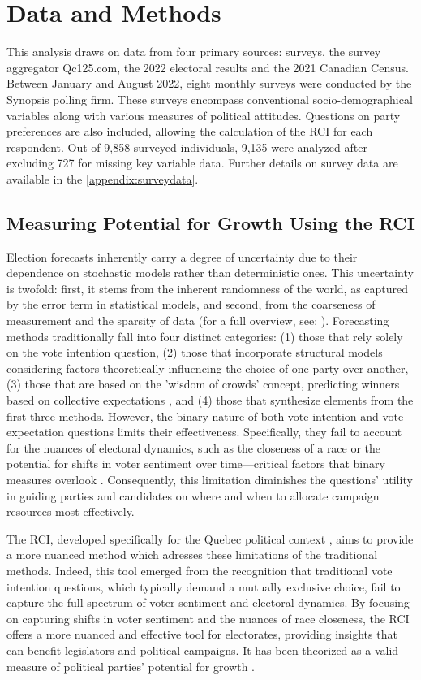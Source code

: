 \documentclass[
  journal=medium,
  manuscript=article-type,
  year=2024
]{cup-journal}
\begin{document}
\section{Data and Methods}
This analysis draws on data from four primary sources: surveys, the survey aggregator Qc125.com, the 2022 electoral results and the 2021 Canadian Census. Between January and August 2022, eight monthly surveys were conducted by the Synopsis polling firm. These surveys encompass conventional socio-demographical variables along with various measures of political attitudes. Questions on party preferences are also included, allowing the calculation of the RCI for each respondent. Out of 9,858 surveyed individuals, 9,135 were analyzed after excluding 727 for missing key variable data. Further details on survey data are available in the \ref{appendix:surveydata}.

\subsection{Measuring Potential for Growth Using the RCI}

Election forecasts inherently carry a degree of uncertainty due to their dependence on stochastic models rather than deterministic ones. This uncertainty is twofold: first, it stems from the inherent randomness of the world, as captured by the error term in statistical models, and second, from the coarseness of measurement and the sparsity of data (for a full overview, see: \textcite{lewis-beck05}). Forecasting methods traditionally fall into four distinct categories: (1) those that rely solely on the vote intention question, (2) those that incorporate structural models considering factors theoretically influencing the choice of one party over another, (3) those that are based on the 'wisdom of crowds' concept, predicting winners based on collective expectations \parencite{bassamboo_etal15}, and (4) those that synthesize elements from the first three methods. However, the binary nature of both vote intention and vote expectation questions limits their effectiveness. Specifically, they fail to account for the nuances of electoral dynamics, such as the closeness of a race or the potential for shifts in voter sentiment over time—critical factors that binary measures overlook \autocite{dufresne_etal22, murr_etal21}. Consequently, this limitation diminishes the questions' utility in guiding parties and candidates on where and when to allocate campaign resources most effectively.

The RCI, developed specifically for the Quebec political context \autocite{dufresne_etal22a}, aims to provide a more nuanced method which adresses these limitations of the traditional methods. Indeed, this tool emerged from the recognition that traditional vote intention questions, which typically demand a mutually exclusive choice, fail to capture the full spectrum of voter sentiment and electoral dynamics. By focusing on capturing shifts in voter sentiment and the nuances of race closeness, the RCI offers a more nuanced and effective tool for electorates, providing insights that can benefit legislators and political campaigns. It has been theorized as a valid measure of political parties' potential for growth \autocite{dufresne_etal22a, dery_etal22}.
\end{document}
